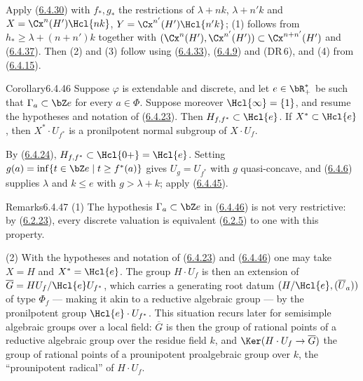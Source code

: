\documentclass[12pt,a4paper,oneside,english]{smfart}
\makeatletter
\newcommand{\btanchor}[1]{\leavevmode\Hy@raisedlink{\hypertarget{bt:#1}{}}}
\newcommand{\btref}[1]{\hyperlink{bt:#1}{#1}}
\theoremstyle{definition}
\theoremstyle{bt}
\makeatother
\begin{document}
\begin{sketch}
Apply (\btref{6.4.30}) with $f_{*},g_{*}$ the restrictions of $\lambda+nk$,
$\lambda+n'k$ and $X=\Cx^{n}(H')\Hcl{nk}$, $Y=\Cx^{n'}(H')\Hcl{n'k}$;
(1) follows from $h_{*}\ge\lambda+(n+n')k$ together with
$(\Cx^{n}(H'),\Cx^{n'}(H'))\subset\Cx^{n+n'}(H')$ and (\btref{6.4.37}). Then (2)
and (3) follow using (\btref{6.4.33}), (\btref{6.4.9}) and (DR\,6), and (4) from
(\btref{6.4.15}).
\end{sketch}

\begin{bt}{Corollary}{6.4.46}\btanchor{6.4.46}
Suppose $\varphi$ is extendable and discrete, and let $e\in\bR^{*}_{+}$
be such that $\Gamma_a\subset\bZ e$ for every $a\in\Phi$. Suppose
moreover $\Hcl{\infty}=\{1\}$, and resume the hypotheses and notation of
(\btref{6.4.23}). Then $H_{f,f^{*}}\subset \Hcl{e}$. If $X^{*}\subset \Hcl{e}$,
then $X^{*}\cdot U_{f^{*}}$ is a pronilpotent normal subgroup of
$X\cdot U_f$.
\end{bt}

\begin{sketch}
By (\btref{6.4.24}), $H_{f,f^{*}}\subset \Hcl{0+}=\Hcl{e}$. Setting
$g(a)=\inf\{t\in\bZ e\mid t\ge f^{*}(a)\}$ gives $U_g=U_{f^{*}}$ with
$g$ quasi-concave, and (\btref{6.4.6}) supplies $\lambda$ and $k\le e$ with
$g>\lambda+k$; apply (\btref{6.4.45}).
\end{sketch}

\begin{bt}{Remarks}{6.4.47}\btanchor{6.4.47}
(1) The hypothesis $\Gamma_a\subset\bZ e$ in (\btref{6.4.46}) is not very
restrictive: by (\btref{6.2.23}), every discrete valuation is equivalent
(\btref{6.2.5}) to one with this property.

(2) With the hypotheses and notation of (\btref{6.4.23}) and (\btref{6.4.46}) one may
take $X=H$ and $X^{*}=\Hcl{e}$. The group $H\cdot U_f$ is then an
extension of $\overline{G}=HU_f/\Hcl{e}U_{f^{*}}$, which carries a
generating root datum $(H/\Hcl{e},(\overline{U}_a))$ of type
$\Phi_f$ --- making it akin to a reductive algebraic group --- by the
pronilpotent group $\Hcl{e}\cdot U_{f^{*}}$. This situation recurs later
for semisimple algebraic groups over a local field: $\overline{G}$ is
then the group of rational points of a reductive algebraic group over
the residue field $k$, and $\Ker(H\cdot U_f\to\overline{G})$ the group of
rational points of a prounipotent proalgebraic group over $k$, the
``prounipotent radical'' of $H\cdot U_f$.
\end{bt}
\end{document}
